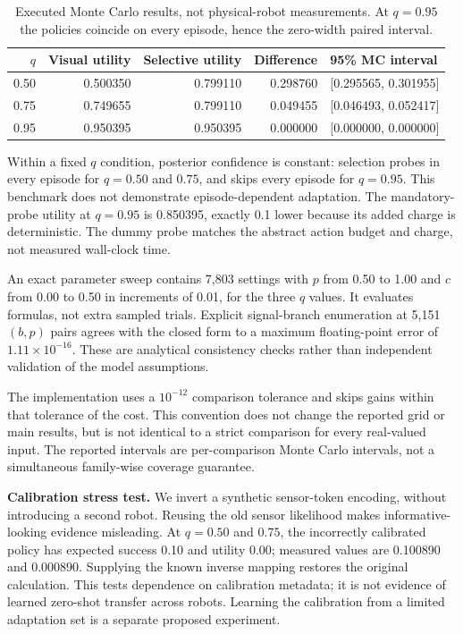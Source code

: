 \documentclass[11pt]{article}
\begin{document}
\begin{table}[ht]
\centering\small
\begin{tabular}{@{}rrrrl@{}}
\toprule
$q$ & Visual utility & Selective utility & Difference & 95\% MC interval\\
\midrule
0.50 & 0.500350 & 0.799110 & 0.298760 & [0.295565, 0.301955]\\
0.75 & 0.749655 & 0.799110 & 0.049455 & [0.046493, 0.052417]\\
0.95 & 0.950395 & 0.950395 & 0.000000 & [0.000000, 0.000000]\\
\bottomrule
\end{tabular}
\caption{Executed Monte Carlo results, not physical-robot measurements. At $q=0.95$ the policies coincide on every episode, hence the zero-width paired interval.}
\label{tab:mc}
\end{table}

Within a fixed $q$ condition, posterior confidence is constant: selection probes in every episode for $q=0.50$ and $0.75$, and skips every episode for $q=0.95$. This benchmark does not demonstrate episode-dependent adaptation. The mandatory-probe utility at $q=0.95$ is 0.850395, exactly 0.1 lower because its added charge is deterministic. The dummy probe matches the abstract action budget and charge, not measured wall-clock time.

An exact parameter sweep contains 7,803 settings with $p$ from 0.50 to 1.00 and $c$ from 0.00 to 0.50 in increments of 0.01, for the three $q$ values. It evaluates formulas, not extra sampled trials. Explicit signal-branch enumeration at 5,151 $(b,p)$ pairs agrees with the closed form to a maximum floating-point error of $1.11\times10^{-16}$. These are analytical consistency checks rather than independent validation of the model assumptions.

The implementation uses a $10^{-12}$ comparison tolerance and skips gains within that tolerance of the cost. This convention does not change the reported grid or main results, but is not identical to a strict comparison for every real-valued input. The reported intervals are per-comparison Monte Carlo intervals, not a simultaneous family-wise coverage guarantee.

\textbf{Calibration stress test.} We invert a synthetic sensor-token encoding, without introducing a second robot. Reusing the old sensor likelihood makes informative-looking evidence misleading. At $q=0.50$ and $0.75$, the incorrectly calibrated policy has expected success 0.10 and utility 0.00; measured values are 0.100890 and 0.000890. Supplying the known inverse mapping restores the original calculation. This tests dependence on calibration metadata; it is not evidence of learned zero-shot transfer across robots. Learning the calibration from a limited adaptation set is a separate proposed experiment.
\end{document}
